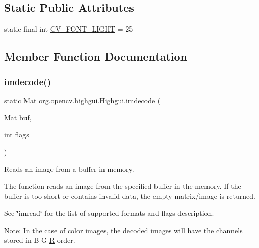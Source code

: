 \subsection*{Static Public Attributes}
\begin{DoxyCompactItemize}
\item 
static final int \mbox{\hyperlink{classorg_1_1opencv_1_1highgui_1_1_highgui_a7c1682eaa282f2d7f586689734ca723c}{C\+V\+\_\+\+F\+O\+N\+T\+\_\+\+L\+I\+G\+HT}} = 25
\end{DoxyCompactItemize}


\subsection{Member Function Documentation}
\mbox{\label{classorg_1_1opencv_1_1highgui_1_1_highgui_a6d7448d231f18708a101435c0eef2a09}} 
\subsubsection{\texorpdfstring{imdecode()}{imdecode()}}
{\footnotesize\ttfamily static \mbox{\hyperlink{classorg_1_1opencv_1_1core_1_1_mat}{Mat}} org.\+opencv.\+highgui.\+Highgui.\+imdecode (\begin{DoxyParamCaption}\item[{\mbox{\hyperlink{classorg_1_1opencv_1_1core_1_1_mat}{Mat}}}]{buf,  }\item[{int}]{flags }\end{DoxyParamCaption})\hspace{0.3cm}{\ttfamily [static]}}

Reads an image from a buffer in memory.

The function reads an image from the specified buffer in the memory. If the buffer is too short or contains invalid data, the empty matrix/image is returned.

See \char`\"{}imread\char`\"{} for the list of supported formats and flags description.

Note\+: In the case of color images, the decoded images will have the channels stored in {\ttfamily B G \mbox{\hyperlink{classorg_1_1opencv_1_1_r}{R}}} order.


